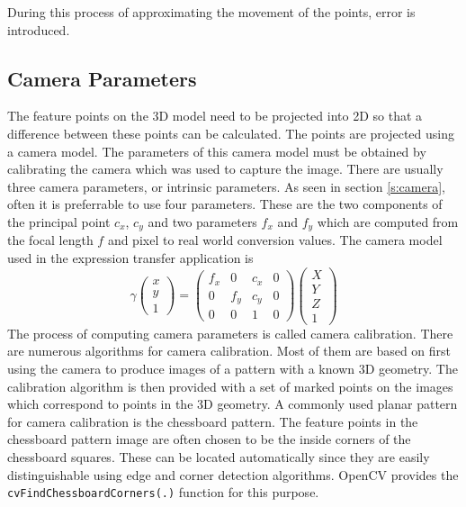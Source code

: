 \documentclass[11pt,a4paper]{report}
\begin{document}
During this process of approximating the
movement of the points, error is introduced. 
\subsection{Camera Parameters}
The feature points on the 3D model need to be projected into 2D so that a
difference between these points can be calculated. The points are projected
using a camera model. The parameters of this camera model must be obtained by calibrating the camera which
was used to capture the image. There are usually three camera parameters, or intrinsic
parameters. As seen in section \ref{s:camera}, often it is preferrable to use
four parameters. These are the two components of the principal point $c_x$,
$c_y$ and two parameters $f_x$ and $f_y$ which are computed from the focal
length $f$ and pixel to real world conversion values. The camera model used in
the expression transfer application is
\begin{equation}\label{eq:projective}
\gamma\begin{pmatrix}x\\y\\1\end{pmatrix}
= \begin{pmatrix}f_x&0&c_x&0\\0&f_y&c_y&0\\0&0&1&0\end{pmatrix} \begin{pmatrix}X\\Y\\Z\\1\end{pmatrix}
\end{equation}
The process of computing camera parameters is called camera calibration. There
are numerous algorithms for camera calibration. Most of them are based on first
using the camera to produce images of a pattern with a known 3D geometry. The calibration algorithm is then
provided with a set of marked points on the images which correspond to points in
the 3D geometry. A commonly used planar pattern for camera calibration is
the chessboard pattern. The feature points in the chessboard pattern image are
often chosen to be the inside corners of the chessboard squares. These can
be located automatically since they are easily distinguishable using edge and
corner detection algorithms. OpenCV provides the
\texttt{cvFindChessboardCorners(.)} function for this purpose.
\end{document}
